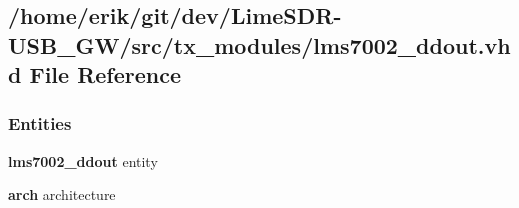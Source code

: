 \subsection{/home/erik/git/dev/\+Lime\+S\+D\+R-\/\+U\+S\+B\+\_\+\+G\+W/src/tx\+\_\+modules/lms7002\+\_\+ddout.vhd File Reference}
\label{tx__modules_2lms7002__ddout_8vhd}
\subsubsection*{Entities}
\begin{DoxyCompactItemize}
\item 
{\bf lms7002\+\_\+ddout} entity
\item 
{\bf arch} architecture
\end{DoxyCompactItemize}
